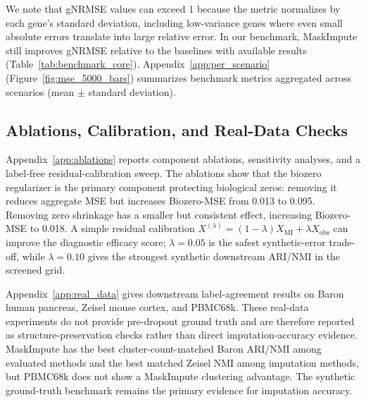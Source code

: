 \documentclass{article}
\theoremstyle{plain}
\theoremstyle{definition}
\theoremstyle{remark}
\begin{document}
We note that gNRMSE values can exceed 1 because the metric normalizes by each
gene's standard deviation, including low-variance genes where even small
absolute errors translate into large relative error. In our benchmark, MaskImpute
still improves gNRMSE relative to the baselines with available results
(Table~\ref{tab:benchmark_core}).
Appendix~\ref{app:per_scenario} (Figure~\ref{fig:mse_5000_bars}) summarizes
benchmark metrics aggregated across scenarios (mean $\pm$ standard deviation).

\subsection{Ablations, Calibration, and Real-Data Checks}
\label{sec:phase6_results}
Appendix~\ref{app:ablations} reports component ablations, sensitivity analyses,
and a label-free residual-calibration sweep. The ablations show that the
biozero regularizer is the primary component protecting biological zeros:
removing it reduces aggregate MSE but increases Biozero-MSE from 0.013 to
0.095. Removing zero shrinkage has a smaller but consistent effect, increasing
Biozero-MSE to 0.018. A simple residual calibration
$X^{(\lambda)}=(1-\lambda)X_{\mathrm{MI}}+\lambda X_{\mathrm{obs}}$ can improve
the diagnostic efficacy score; $\lambda=0.05$ is the safest synthetic-error
trade-off, while $\lambda=0.10$ gives the strongest synthetic downstream
ARI/NMI in the screened grid.

Appendix~\ref{app:real_data} gives downstream label-agreement results on Baron
human pancreas, Zeisel mouse cortex, and PBMC68k. These real-data experiments do
not provide pre-dropout ground truth and are therefore reported as
structure-preservation checks rather than direct imputation-accuracy evidence.
MaskImpute has the best cluster-count-matched Baron ARI/NMI among evaluated
methods and the best matched Zeisel NMI among imputation methods, but PBMC68k
does not show a MaskImpute clustering advantage. The synthetic ground-truth
benchmark remains the primary evidence for imputation accuracy.
\end{document}
